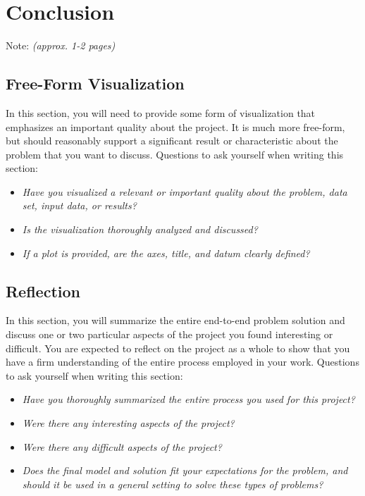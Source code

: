 \documentclass{article}
\begin{document}
\section{Conclusion}\label{conclusion}

Note: \emph{(approx. 1-2 pages)}


\subsection{Free-Form Visualization}\label{free-form-visualization}

In this section, you will need to provide some form of visualization
that emphasizes an important quality about the project. It is much more
free-form, but should reasonably support a significant result or
characteristic about the problem that you want to discuss. Questions to
ask yourself when writing this section:

\begin{itemize}
\item
  \emph{Have you visualized a relevant or important quality about the
  problem, data set, input data, or results?}
\item
  \emph{Is the visualization thoroughly analyzed and discussed?}
\item
  \emph{If a plot is provided, are the axes, title, and datum clearly
  defined?}
\end{itemize}

\subsection{Reflection}\label{reflection}

In this section, you will summarize the entire end-to-end problem
solution and discuss one or two particular aspects of the project you
found interesting or difficult. You are expected to reflect on the
project as a whole to show that you have a firm understanding of the
entire process employed in your work. Questions to ask yourself when
writing this section:

\begin{itemize}
\item
  \emph{Have you thoroughly summarized the entire process you used for
  this project?}
\item
  \emph{Were there any interesting aspects of the project?}
\item
  \emph{Were there any difficult aspects of the project?}
\item
  \emph{Does the final model and solution fit your expectations for the
  problem, and should it be used in a general setting to solve these
  types of problems?}
\end{itemize}
\end{document}

